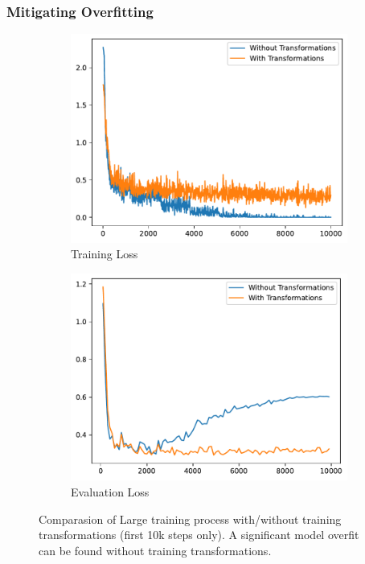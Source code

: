 \subsubsection{Mitigating Overfitting}\label{sec:overfit}

\begin{figure}
    \centering
    \begin{subfigure}{0.48\textwidth}
        \centering
        \includegraphics[width=\linewidth]{graphs/training/trans_img_training_loss_curve.pdf}
        \caption{Training Loss}
    \end{subfigure}
    \begin{subfigure}{0.48\textwidth}
        \centering
        \includegraphics[width=\linewidth]{graphs/training/trans_img_eval_loss_curve.pdf}
        \caption{Evaluation Loss}
    \end{subfigure}
    \caption{Comparasion of \VIT Large training process with/without training transformations (first 10k steps only). A significant model overfit can be found without training transformations.}
    \label{fig:overfit}
\end{figure}

